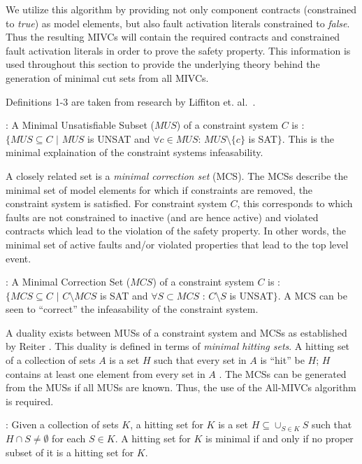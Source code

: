 We utilize this algorithm by providing not only component contracts (constrained to \textit{true}) as model elements, but also fault activation literals constrained to \textit{false}. Thus the resulting MIVCs will contain the required contracts and constrained fault activation literals in order to prove the safety property. This information is used throughout this section to provide the underlying theory behind the generation of minimal cut sets from all MIVCs. 

Definitions 1-3 are taken from research by Liffiton et. al.~\cite{liffiton2016fast}. 

\begin{definition} : A Minimal Unsatisfiable Subset ($MUS$) of a constraint system $C$ is :\\
 $\{MUS \subseteq C$ $|$ $MUS$ is UNSAT and $\forall c \in MUS$: $MUS \setminus \{c\}$ is SAT$\}$. This is the minimal explaination of the constraint systems infeasability. 
\end{definition}

A closely related set is a \textit{minimal correction set} (MCS). The MCSs describe the minimal set of model elements for which if constraints are removed, the constraint system is satisfied. For constraint system $C$, this corresponds to which faults are not constrained to inactive (and are hence active) and violated contracts which lead to the violation of the safety property. In other words, the minimal set of active faults and/or violated properties that lead to the top level event.  

\begin{definition} : A Minimal Correction Set ($MCS$) of a constraint system $C$ is :\\
 $\{MCS \subseteq C$ $|$ $C \setminus MCS$ is SAT and $\forall S \subset MCS$ : $C \setminus S$ is UNSAT$\}$. A MCS can be seen to ``correct'' the infeasability of the constraint system.
\end{definition}

A duality exists between MUSs of a constraint system and MCSs as established by Reiter \cite{reiter1987theory}. This duality is defined in terms of \textit{minimal hitting sets}. A hitting set of a collection of sets $A$ is a set $H$ such that every set in $A$ is ``hit'' be $H$; $H$ contains at least one element from every set in $A$ \cite{liffiton2016fast}. The MCSs can be generated from the MUSs if all MUSs are known. Thus, the use of the All-MIVCs algorithm is required. 

\begin{definition}: Given a collection of sets $K$, a hitting set for $K$ is a set $H \subseteq \cup_{S \in K} S$ such that $H \cap S \neq \emptyset$ for each $S  \in K$. A hitting set for $K$ is minimal if and only if no proper subset of it is a hitting set for $K$. 
\end{definition}

